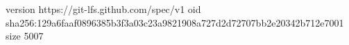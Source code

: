 version https://git-lfs.github.com/spec/v1
oid sha256:129a6faaf0896385b3f3a03c23a9821908a727d2d72707bb2e20342b712e7001
size 5007
